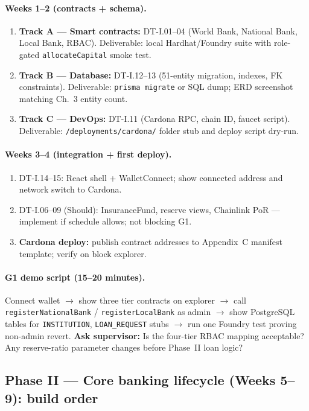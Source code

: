 \documentclass[12pt,a4paper]{report}
\begin{document}
\paragraph{Weeks 1--2 (contracts + schema).}
\begin{enumerate}[noitemsep]
\item \textbf{Track A --- Smart contracts:} DT-I.01--04 (World Bank, National Bank, Local Bank, RBAC). Deliverable: local Hardhat/Foundry suite with role-gated \texttt{allocateCapital} smoke test.
\item \textbf{Track B --- Database:} DT-I.12--13 (51-entity migration, indexes, FK constraints). Deliverable: \texttt{prisma migrate} or SQL dump; ERD screenshot matching Ch.~3 entity count.
\item \textbf{Track C --- DevOps:} DT-I.11 (Cardona RPC, chain ID, faucet script). Deliverable: \texttt{/deployments/cardona/} folder stub and deploy script dry-run.
\end{enumerate}

\paragraph{Weeks 3--4 (integration + first deploy).}
\begin{enumerate}[noitemsep]
\item DT-I.14--15: React shell + WalletConnect; show connected address and network switch to Cardona.
\item DT-I.06--09 (Should): InsuranceFund, reserve views, Chainlink PoR --- implement if schedule allows; not blocking G1.
\item \textbf{Cardona deploy:} publish contract addresses to Appendix~C manifest template; verify on block explorer.
\end{enumerate}

\paragraph{G1 demo script (15--20 minutes).}
Connect wallet $\to$ show three tier contracts on explorer $\to$ call \texttt{registerNationalBank} / \texttt{registerLocalBank} as admin $\to$ show PostgreSQL tables for \texttt{INSTITUTION}, \texttt{LOAN\_REQUEST} stubs $\to$ run one Foundry test proving non-admin revert. \textbf{Ask supervisor:} Is the four-tier RBAC mapping acceptable? Any reserve-ratio parameter changes before Phase~II loan logic?

\subsection{Phase II --- Core banking lifecycle (Weeks 5--9): build order}
\end{document}
